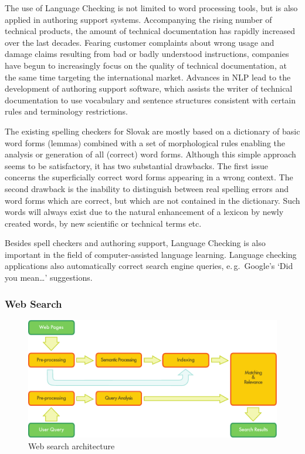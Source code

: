\begin{multicols}{2}
The use of Language Checking is not limited to word processing tools, but is also applied in authoring support systems. Accompanying the rising number of technical products, the amount of technical documentation has rapidly increased over the last decades. Fearing customer complaints about wrong usage and damage claims resulting from bad or badly understood instructions, companies have begun to increasingly focus on the quality of technical documentation, at the same time targeting the international market. Advances in NLP lead to the development of authoring support software, which assists the writer of technical documentation to use vocabulary and sentence structures consistent with certain rules and terminology restrictions.


The existing spelling checkers for Slovak are mostly based on a dictionary of basic word forms (lemmas) combined with a set of morphological rules enabling the analysis or generation of all (correct) word forms. Although this simple approach seems to be satisfactory, it has two substantial drawbacks. The first issue concerns the superficially correct word forms appearing in a wrong context. The second drawback is the inability to distinguish between real spelling errors and word forms which are correct, but which are not contained in the dictionary. Such words will always exist due to the natural enhancement of a lexicon by newly created words, by new scientific or technical terms etc.

Besides spell checkers and authoring support, Language Checking is also important in the field of computer-assisted language learning. Language checking applications also automatically correct search engine queries, e.\,g.~Google’s ‘Did you mean\dots’ suggestions. 

\subsubsection{Web Search}

\begin{figure}[htb]
  \center
  \includegraphics[width=\textwidth]{../_media/english/web_search_architecture}
  \caption{Web search architecture}
  \label{fig:websearcharch_en}
 \end{figure}


\end{multicols}
